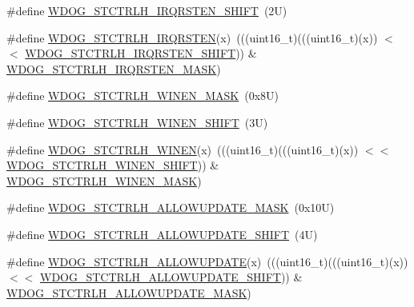\begin{DoxyCompactItemize}
\item 
\#define \mbox{\hyperlink{group___w_d_o_g___register___masks_ga0b519bf4ae17a11b51878819d4249e00}{W\+D\+O\+G\+\_\+\+S\+T\+C\+T\+R\+L\+H\+\_\+\+I\+R\+Q\+R\+S\+T\+E\+N\+\_\+\+S\+H\+I\+FT}}~(2\+U)
\item 
\#define \mbox{\hyperlink{group___w_d_o_g___register___masks_gaa041a01bbc0a93451123273829f622cc}{W\+D\+O\+G\+\_\+\+S\+T\+C\+T\+R\+L\+H\+\_\+\+I\+R\+Q\+R\+S\+T\+EN}}(x)~(((uint16\+\_\+t)(((uint16\+\_\+t)(x)) $<$$<$ \mbox{\hyperlink{group___w_d_o_g___register___masks_ga0b519bf4ae17a11b51878819d4249e00}{W\+D\+O\+G\+\_\+\+S\+T\+C\+T\+R\+L\+H\+\_\+\+I\+R\+Q\+R\+S\+T\+E\+N\+\_\+\+S\+H\+I\+FT}})) \& \mbox{\hyperlink{group___w_d_o_g___register___masks_ga64ebb40c66318cac7631c3fd467c846a}{W\+D\+O\+G\+\_\+\+S\+T\+C\+T\+R\+L\+H\+\_\+\+I\+R\+Q\+R\+S\+T\+E\+N\+\_\+\+M\+A\+SK}})
\item 
\#define \mbox{\hyperlink{group___w_d_o_g___register___masks_ga74edc83d2a673f012aeff6410a8be861}{W\+D\+O\+G\+\_\+\+S\+T\+C\+T\+R\+L\+H\+\_\+\+W\+I\+N\+E\+N\+\_\+\+M\+A\+SK}}~(0x8\+U)
\item 
\#define \mbox{\hyperlink{group___w_d_o_g___register___masks_gae0770ee0a74441bd3d2e0d3c291ca4b6}{W\+D\+O\+G\+\_\+\+S\+T\+C\+T\+R\+L\+H\+\_\+\+W\+I\+N\+E\+N\+\_\+\+S\+H\+I\+FT}}~(3\+U)
\item 
\#define \mbox{\hyperlink{group___w_d_o_g___register___masks_ga6e8b1ce8d5dee4ce41dc4dcea04711e7}{W\+D\+O\+G\+\_\+\+S\+T\+C\+T\+R\+L\+H\+\_\+\+W\+I\+N\+EN}}(x)~(((uint16\+\_\+t)(((uint16\+\_\+t)(x)) $<$$<$ \mbox{\hyperlink{group___w_d_o_g___register___masks_gae0770ee0a74441bd3d2e0d3c291ca4b6}{W\+D\+O\+G\+\_\+\+S\+T\+C\+T\+R\+L\+H\+\_\+\+W\+I\+N\+E\+N\+\_\+\+S\+H\+I\+FT}})) \& \mbox{\hyperlink{group___w_d_o_g___register___masks_ga74edc83d2a673f012aeff6410a8be861}{W\+D\+O\+G\+\_\+\+S\+T\+C\+T\+R\+L\+H\+\_\+\+W\+I\+N\+E\+N\+\_\+\+M\+A\+SK}})
\item 
\#define \mbox{\hyperlink{group___w_d_o_g___register___masks_gaf524a1ad1f811741b27f29836d6137ee}{W\+D\+O\+G\+\_\+\+S\+T\+C\+T\+R\+L\+H\+\_\+\+A\+L\+L\+O\+W\+U\+P\+D\+A\+T\+E\+\_\+\+M\+A\+SK}}~(0x10\+U)
\item 
\#define \mbox{\hyperlink{group___w_d_o_g___register___masks_gaf2ae60bccb334321f860b2480d916604}{W\+D\+O\+G\+\_\+\+S\+T\+C\+T\+R\+L\+H\+\_\+\+A\+L\+L\+O\+W\+U\+P\+D\+A\+T\+E\+\_\+\+S\+H\+I\+FT}}~(4\+U)
\item 
\#define \mbox{\hyperlink{group___w_d_o_g___register___masks_gae83021f9bb1b47ec182a39e3badb563a}{W\+D\+O\+G\+\_\+\+S\+T\+C\+T\+R\+L\+H\+\_\+\+A\+L\+L\+O\+W\+U\+P\+D\+A\+TE}}(x)~(((uint16\+\_\+t)(((uint16\+\_\+t)(x)) $<$$<$ \mbox{\hyperlink{group___w_d_o_g___register___masks_gaf2ae60bccb334321f860b2480d916604}{W\+D\+O\+G\+\_\+\+S\+T\+C\+T\+R\+L\+H\+\_\+\+A\+L\+L\+O\+W\+U\+P\+D\+A\+T\+E\+\_\+\+S\+H\+I\+FT}})) \& \mbox{\hyperlink{group___w_d_o_g___register___masks_gaf524a1ad1f811741b27f29836d6137ee}{W\+D\+O\+G\+\_\+\+S\+T\+C\+T\+R\+L\+H\+\_\+\+A\+L\+L\+O\+W\+U\+P\+D\+A\+T\+E\+\_\+\+M\+A\+SK}})
$$
\end{DoxyCompactItemize}
